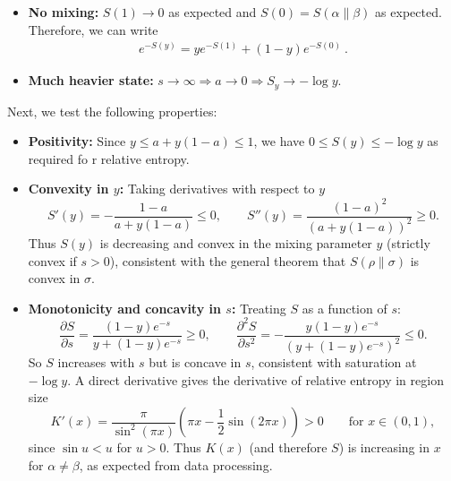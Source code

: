 \documentclass[11pt]{article}
\begin{document}
{\begin{itemize}
    \item \textbf{No mixing:} $S(1)\to 0$ as expected and
      $S(0)=S(\alpha\|\beta)$ as expected. Therefore, we can write
      \begin{eqnarray}
        e^{-S(y)}=y e^{-S(1)}+(1-y)e^{-S(0)}\ .
      \end{eqnarray}

    \item \textbf{Much heavier state:}
      $s\to\infty\Rightarrow a\to 0\Rightarrow S_{y}\to -\log y$.
  \end{itemize}

  Next, we test the following properties:

  \begin{itemize}
    \item \textbf{Positivity:} Since $y\le a+y(1-a)\le 1$, we have $0\le S(y)\le
      -\log y$ as required fo r relative entropy.

    \item \textbf{Convexity in $y$:} Taking derivatives with respect to $y$
      \begin{equation}
        S'(y)= -\frac{1-a}{a+y(1-a)}\le 0, \qquad S''(y)=\frac{(1-a)^{2}}{(a+y(1-a))^{2}}
        \ge 0.
      \end{equation}
      Thus $S(y)$ is decreasing and convex in the mixing parameter $y$ (strictly
      convex if $s>0$), consistent with the general theorem that $S(\rho\|\sigma)$
      is convex in $\sigma$.

    \item \textbf{Monotonicity and concavity in $s$:} Treating $S$ as a function
      of $s$:
      \begin{equation}
        \frac{\partial S}{\partial s}=\frac{(1-y)e^{-s}}{y+(1-y)e^{-s}}\ge 0, \qquad
        \frac{\partial^{2}S}{\partial s^{2}}=-\frac{y(1-y)e^{-s}}{(y+(1-y)e^{-s})^{2}}
        \le 0.
      \end{equation}
      So $S$ increases with $s$ but is concave in $s$, consistent with
      saturation at $-\log y$. A direct derivative gives the derivative of relative
      entropy in region size
      \begin{equation}
        K'(x)=\frac{\pi}{\sin^{2}(\pi x)}\left(\pi x-\frac{1}{2}\sin(2\pi x)\right
        )>0 \qquad \text{for }x\in(0,1),
      \end{equation}
      since $\sin u<u$ for $u>0$. Thus $K(x)$ (and therefore $S$) is increasing
      in $x$ for $\alpha\neq\beta$, as expected from data processing.
  \end{itemize}

}
\end{document}
